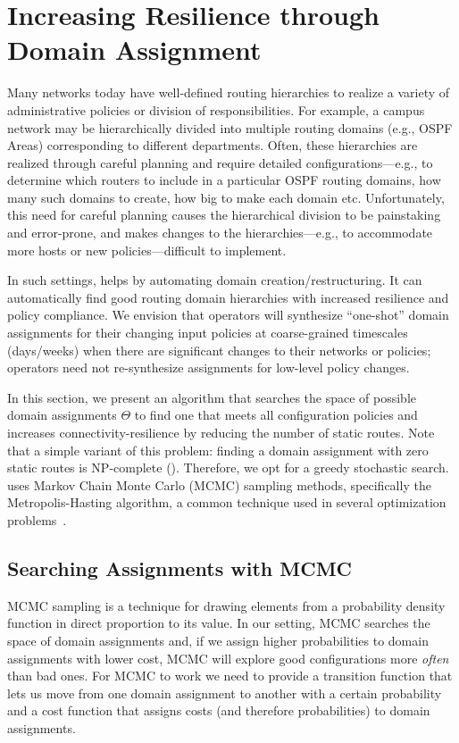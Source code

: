 \section{Increasing Resilience through Domain Assignment}
\label{sec:synth-dom-ass}
Many networks today have well-defined routing hierarchies to realize a variety of administrative  policies or division of responsibilities. For example, a campus network may be hierarchically divided into multiple routing domains (e.g., OSPF Areas) corresponding to different departments. Often, these hierarchies are realized through careful planning and require detailed configurations---e.g., to determine which routers to include in a particular OSPF routing domains, how many such domains to create, how big to make each domain etc. Unfortunately, this 
need for careful planning
causes the hierarchical division to be painstaking and error-prone, and makes changes to  the hierarchies---e.g., to accommodate more hosts or new policies---difficult to implement.

In such settings, \name helps by automating domain creation/restructuring. It can automatically find good routing domain hierarchies with increased resilience and policy compliance. We envision that operators will synthesize ``one-shot'' domain assignments for their changing input policies at coarse-grained timescales (days/weeks) when there are significant changes to their networks or policies; operators need not re-synthesize  assignments for low-level policy changes.


In this section, we present an algorithm 
that searches the space of possible domain assignments $\Theta$ to find
one that meets all configuration policies and increases 
connectivity-resilience by reducing the number of static routes.
Note that a simple variant of this problem: 
finding a domain assignment with
zero static routes is NP-complete ().
Therefore, we opt for a greedy
stochastic search.
\name uses Markov
Chain Monte Carlo (MCMC) sampling methods, 
specifically the Metropolis-Hasting
algorithm, a common technique used in several optimization 
problems~\cite{stoke}. 

\subsection{Searching Assignments with MCMC}
MCMC sampling is a technique for 
drawing elements from a
probability density function in direct proportion to its value.
In our setting, MCMC searches the space of domain assignments and,
if we assign higher probabilities to domain assignments with lower cost, MCMC will explore
good configurations more \emph{often} than bad ones.
For MCMC to work we need to provide a transition function that lets us move from one domain assignment
to another with a certain probability and a cost function that assigns costs (and therefore probabilities) to
domain assignments. 

